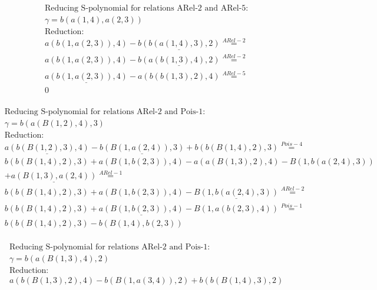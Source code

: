 \documentclass[11pt]{amsart}
\begin{document}
\begin{align*} 
& \text{Reducing S-polynomial for relations ARel-2 and ARel-5:} \\ 
& \gamma = b(a(1,4),a(2,3)) \\ 
& \text{Reduction}: \\&a(b(1,a(2,3)),4) - \underline{b(b(a(1,4),3),2)} \stackrel{ ARel-2 }{=}  \\ 
&a(b(1,a(2,3)),4) - \underline{b(a(b(1,3),4),2)} \stackrel{ ARel-2 }{=}  \\ 
&\underline{a(b(1,a(2,3)),4)} - a(b(b(1,3),2),4) \stackrel{ ARel-5 }{=}  \\ 
&0\\ 
\end{align*} 
 
\begin{align*} 
& \text{Reducing S-polynomial for relations ARel-2 and Pois-1:} \\ 
& \gamma = b(a(B(1,2),4),3) \\ 
& \text{Reduction}: \\&\underline{a(b(B(1,2),3),4)} - \underline{b(B(1,a(2,4)),3)} + b(b(B(1,4),2),3) \stackrel{ Pois-4 }{=}  \\ 
&b(b(B(1,4),2),3) + a(B(1,b(2,3)),4) - a(a(B(1,3),2),4) - B(1,b(a(2,4),3))\\ 
 &  + \underline{a(B(1,3),a(2,4))} \stackrel{ ARel-1 }{=}  \\ 
&b(b(B(1,4),2),3) + a(B(1,b(2,3)),4) - \underline{B(1,b(a(2,4),3))} \stackrel{ ARel-2 }{=}  \\ 
&b(b(B(1,4),2),3) + \underline{a(B(1,b(2,3)),4)} - B(1,a(b(2,3),4)) \stackrel{ Pois-1 }{=}  \\ 
&b(b(B(1,4),2),3) - b(B(1,4),b(2,3))\\ 
\end{align*} 
 
\begin{align*} 
& \text{Reducing S-polynomial for relations ARel-2 and Pois-1:} \\ 
& \gamma = b(a(B(1,3),4),2) \\ 
& \text{Reduction}: \\&a(b(B(1,3),2),4) - b(B(1,a(3,4)),2) + b(b(B(1,4),3),2)\\ 
\end{align*} 
 
\end{document}
